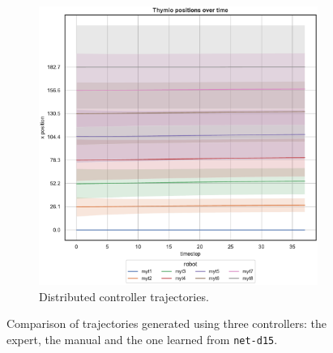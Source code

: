 \begin{figure}[!htb]
\begin{center}
\begin{subfigure}[h]{0.49\textwidth}
			\includegraphics[width=.9\textwidth]{contents/images/net-d15/position-overtime-learned_distributed}
			\caption{Distributed controller trajectories.}
		\end{subfigure}
	\end{center}
	\caption[Evaluation of the trajectories learned by 
	\texttt{net-d15}.]{Comparison of trajectories generated using three controllers: 
		the expert, the manual and the one learned from \texttt{net-d15}.}
\end{figure}
